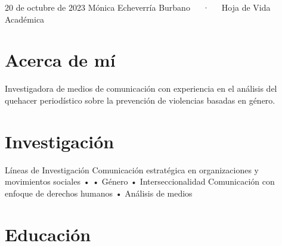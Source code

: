 \documentclass[11pt,a4paper,]{awesome-cv}
\begin{document}
\makecvheader

\makecvfooter
  {20 de octubre de 2023}
    {Mónica Echeverría Burbano~~~·~~~Hoja de Vida Académica}
  {\thepage}





\hypertarget{acerca-de-muxed}{%
\section{Acerca de mí}\label{acerca-de-muxed}}

Investigadora de medios de comunicación con experiencia en el análisis
del quehacer periodístico sobre la prevención de violencias basadas en
género.

\hypertarget{investigaciuxf3n}{%
\section{Investigación}\label{investigaciuxf3n}}

\begin{cvskills}
  \cvskill
    {Líneas de Investigación}
    {Comunicación estratégica en organizaciones y movimientos sociales •  • Género • Interseccionalidad \newline
    Comunicación con enfoque de derechos humanos • Análisis de medios}
\end{cvskills}

\hypertarget{educaciuxf3n}{%
\section{Educación}\label{educaciuxf3n}}

\begin{cventries}
    \vspace{-4.0mm}
    \vspace{-4.0mm}
    \vspace{-4.0mm}
    \vspace{-4.0mm}
    \vspace{-4.0mm}
\end{cventries}
\end{document}
